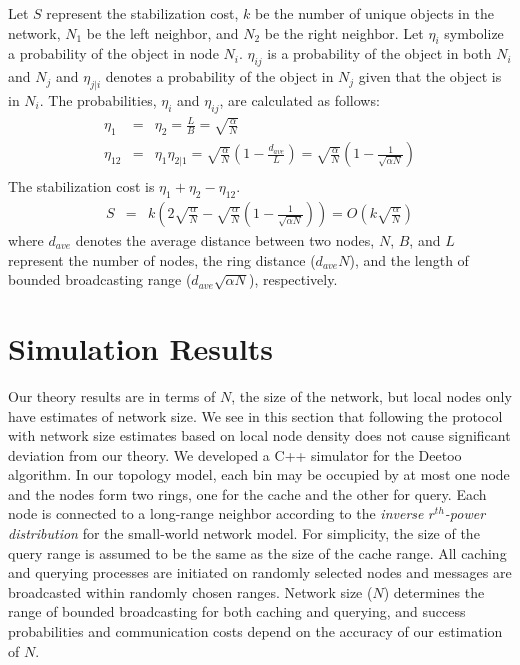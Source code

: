 \documentclass[conference]{IEEEtran}
\begin{document}
Let $S$ represent the stabilization cost, $k$ be the number of unique objects in the network, 
$N_1$ be the left neighbor, 
and $N_2$ be the right neighbor. Let $\eta_i$ symbolize a probability of the object in node $N_i$. 
$\eta_{ij}$ is a probability of the object in both $N_i$ and $N_j$ and  
$\eta_{j|i}$ denotes a probability of the object in $N_j$ given that the object is in 
$N_i$. 
The probabilities, $\eta_i$ and $\eta_{ij}$, are calculated as follows:
\begin{eqnarray*}
\eta_1 &=& \eta_2 = \frac{L}{B} = \sqrt{\frac{\alpha}{N}} \\
\eta_{12} &=& \eta_1 \eta_{2|1} = \sqrt{\frac{\alpha}{N}}\left( 1-\frac{d_{ave}}{L} \right)
= \sqrt{\frac{\alpha}{N}}\left(1-\frac{1}{\sqrt{\alpha N}}\right) \\
\end{eqnarray*}
The stabilization cost is $\eta_1+\eta_2-\eta_{12}$.
\begin{eqnarray*}
S &=& k\left(2\sqrt{\frac{\alpha}{N}}-\sqrt{\frac{\alpha}{N}}\left(1-\frac{1}{\sqrt{\alpha N}}\right) \right) 
    = O\left(k\sqrt{\frac{\alpha}{N}}\right)
\end{eqnarray*}
where $d_{ave}$ denotes the average distance between two nodes, 
$N$, $B$, and $L$ represent the number 
of nodes, the ring distance ($d_{ave}N$), 
and the length of bounded broadcasting range ($d_{ave}\sqrt{\alpha N}$), respectively.

\section{Simulation Results}\label{sec:simulation}
Our theory results are in terms of $N$, the
size of the network, but local nodes only have estimates of network
size.  We see in this section that following the protocol with network
size estimates based on local node density\cite{LuoQHC08}
does not cause significant deviation from our theory.
We developed a C++ simulator for the Deetoo algorithm.
In our topology model, 
each bin may be occupied by at most one node and the nodes form two rings,
one for the cache and the other for query.
%
Each node is connected to a long-range neighbor according
to the \emph{inverse $r^{th}$-power distribution} for the small-world network model. 
For simplicity, the size of the query range is assumed to be the same as the size of the cache 
range. All caching and querying processes are initiated on randomly selected nodes and
messages are broadcasted within randomly chosen ranges.
Network size ($N$) determines the range of bounded broadcasting for both caching and querying, and
success probabilities and communication costs depend on the accuracy of our estimation of $N$.
\end{document}
